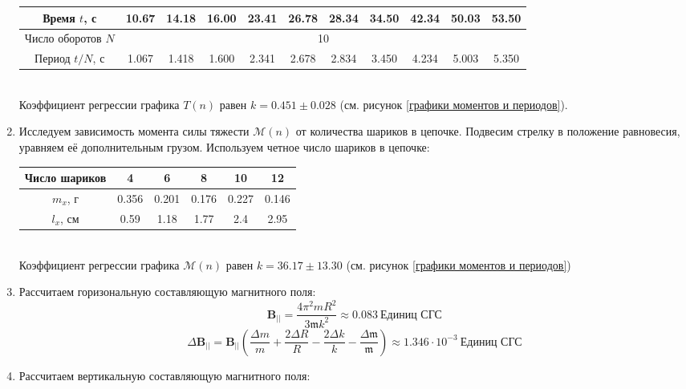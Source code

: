 \documentclass[a4paper, 12pt]{article}
\begin{document}
\begin{enumerate}
\begin{table}[htbp]
\begin{tabular}{|c|c|c|c|c|c|c|c|c|c|c|}
            Время $t$, с & 10.67 & 14.18 & 16.00 & 23.41 & 26.78 & 28.34 & 34.50 & 42.34 & 50.03 & 53.50\\ \hline
            Число оборотов $N$ & \multicolumn{10}{|c|}{10}\\ \hline
            Период $t/N$, с & 1.067 & 1.418 & 1.600 & 2.341 & 2.678 & 2.834 & 3.450 & 4.234 & 5.003 & 5.350\\ \hline
        \end{tabular}
    \end{table}\\
    Коэффициент регрессии графика $T(n)$ равен $k = 0.451\pm 0.028$ (см. рисунок \ref{графики моментов и периодов}).\\
    \item Исследуем зависимость момента силы тяжести $\mathcal{M}(n)$ от количества шариков в цепочке. Подвесим стрелку в положение равновесия, уравняем её дополнительным грузом. Используем четное число шариков в цепочке:
    \begin{table}[htbp]
        \centering
        \begin{tabular}{|c|c|c|c|c|c|}
            \hline
            Число шариков & 4 & 6 & 8 & 10 & 12\\ \hline
            $m_{x}$, г & 0.356 & 0.201 & 0.176 & 0.227 & 0.146\\ \hline
            $l_{x}$, см & 0.59 & 1.18 & 1.77 & 2.4 & 2.95\\ \hline
        \end{tabular}
    \end{table}\\
    Коэффициент регрессии графика $\mathcal{M}(n)$ равен $k = 36.17\pm 13.30$ (см. рисунок \ref{графики моментов и периодов})
    \item Рассчитаем горизональную составляющую магнитного поля:
    \begin{equation*}
        \mathbf{B_{||}} = \frac{4\pi^{2} mR^{2}}{3\mathfrak{m}k^{2}} \approx 0.083\ \text{Единиц СГС}
    \end{equation*}
    \begin{equation*}
        \Delta \mathbf{B_{||}} = \mathbf{B_{||}}\left(\frac{\Delta m}{m} + \frac{2\Delta R}{R} - \frac{2\Delta k}{k} - \frac{\Delta \mathfrak{m}}{\mathfrak{m}}\right) \approx 1.346 \cdot10^{-3}\ \text{Единиц СГС}
    \end{equation*}
    \item Рассчитаем вертикальную составляющую магнитного поля:
    \begin{equation*}

\end{equation*}
\end{enumerate}
\end{document}
